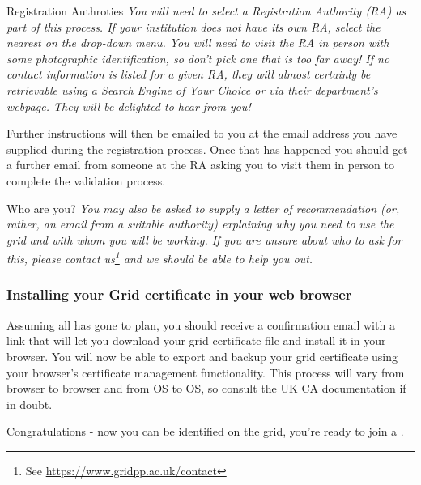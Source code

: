 \begin{infobox}{Registration Authroties}
\emph{You will need to select a Registration Authority (RA) as part of this
process. If your institution does not have its own RA, select the
nearest on the drop-down menu. You will need to visit the RA in person
with some photographic identification, so don't pick one that is too far
away! If no contact information is listed for a given RA, they will
almost certainly be retrievable using a Search Engine of Your Choice or
via their department's webpage. They will be delighted to hear from you!}
\end{infobox}

Further instructions will then be emailed to you at the email address
you have supplied during the registration process. Once that has
happened you should get a further email from someone at the RA asking
you to visit them in person to complete the validation process.

\begin{warningbox}{Who are you?}
\emph{You may also be asked to supply a letter of recommendation (or, rather,
an email from a suitable authority) explaining why you need to use the
grid and with whom you will be working. If you are unsure about who to
ask for this, please contact us\footnote{%
See \href{https://www.gridpp.ac.uk/contact}{https://www.gridpp.ac.uk/contact}}
and we should be able to help you out.}
\end{warningbox}

\subsubsection{Installing your Grid certificate in your web browser}
\label{installing-your-grid-certificate-in-your-web-browser}
Assuming all has gone to plan, you should receive a confirmation email
with a link that will let you download your grid certificate file and
install it in your browser. You will now be able to export and backup
your grid certificate using your browser's certificate management
functionality. This process will vary from browser to browser and from
OS to OS, so consult the
\href{http://www.ngs.ac.uk/ukca/certificates}{UK CA documentation} if in
doubt.

Congratulations - now you can be identified on the grid, you're ready to
join a .

